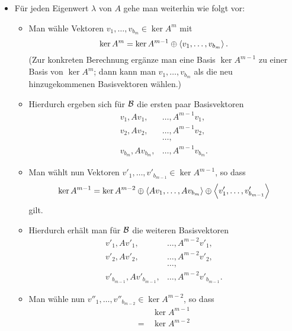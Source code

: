 \begin{itemize}[resume]
  \item
    Für jeden Eigenwert $\lambda$ von $A$ gehe man weiterhin wie folgt vor:
    \begin{itemize}
      \item
        Man wähle Vektoren $v_1, \dotsc, v_{b_m} \in \ker A^m$ mit
        \[
                    \ker A^m
          =         \ker A^{m-1}
            \oplus  \left\langle v_1, \dotsc, v_{b_m} \right\rangle.
        \]
        (Zur konkreten Berechnung ergänze man eine Basis $\ker A^{m-1}$ zu einer Basis von $\ker A^m$; dann kann man $v_1, \dotsc, v_{b_m}$ als die neu hinzugekommenen Basisvektoren wählen.)
      \item
        Hierdurch ergeben sich für $\mathcal{B}$ die ersten paar Basisvektoren
        \begin{align*}
          v_1,     A v_1,     &\dotsc, A^{m-1} v_1,     \\
          v_2,     A v_2,     &\dotsc, A^{m-1} v_2,     \\
                              &\dotsc,                  \\
          v_{b_m}, A v_{b_m}, &\dotsc, A^{m-1} v_{b_m}.
        \end{align*}
      \item
        Man wählt nun Vektoren $v'_1, \dotsc, v'_{b_{m-1}} \in \ker A^{m-1}$, so dass
        \[
                    \ker A^{m-1}
          =         \ker A^{m-2}
            \oplus  \left\langle  A v_1, \dotsc, A v_{b_m}  \right\rangle
            \oplus  \left\langle  v'_1, \dotsc, v'_{b_{m-1}}  \right\rangle
        \]
        gilt.
      \item
        Hierdurch erhält man für $\mathcal{B}$ die weiteren Basisvektoren
        \begin{align*}
          v'_1,         A v'_1,         &\dotsc, A^{m-2} v'_1,          \\
          v'_2,         A v'_2,         &\dotsc, A^{m-2} v'_2,          \\
                                        &\dotsc,                        \\
          v'_{b_{m-1}}, A v'_{b_{m-1}}, &\dotsc, A^{m-2} v'_{b_{m-1}}.
        \end{align*}
      \item
        Man wähle nun $v''_1, \dotsc, v''_{b_{m-2}} \in \ker A^{m-2}$, so dass
        \begin{align*}
           &\,      \ker A^{m-1}  \\
          =&\,      \ker A^{m-2}

\end{align*}
\end{itemize}
\end{itemize}
